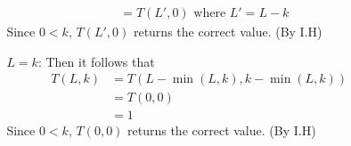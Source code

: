 \documentclass{article}
\begin{document}
\begin{enumerate}
\begin{enumerate}
\begin{enumerate}
\begin{align}
                                       & =T(L',0) \textrm{ where } L' = L - k
                            \end{align}
                            Since \(0 < k\), \(T(L',0)\) returns the correct value. (By I.H)
                        \item[\(L = k\):] Then it follows that
                            \begin{align}
                                T(L,k) & = T(L - \min(L,k), k - \min(L,k)) \\
                                       & =T(0,0)                           \\
                                       & = 1
                            \end{align}
                            Since \(0 < k\), \(T(0,0)\) returns the correct value. (By I.H)

                    \end{enumerate}
          \end{enumerate}
\end{enumerate}
\end{document}

